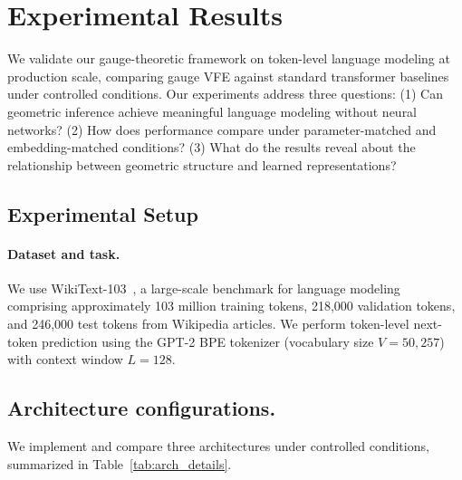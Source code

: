 \documentclass[twoside,11pt]{article}
\begin{document}
\section{Experimental Results}
\label{sec:experiments}

We validate our gauge-theoretic framework on token-level language modeling at production scale, comparing gauge VFE against standard transformer baselines under controlled conditions. Our experiments address three questions: (1) Can geometric inference achieve meaningful language modeling without neural networks? (2) How does performance compare under parameter-matched and embedding-matched conditions? (3) What do the results reveal about the relationship between geometric structure and learned representations?

\subsection{Experimental Setup}
\label{sec:setup}

\paragraph{Dataset and task.}
We use WikiText-103~\citep{merity2016pointer}, a large-scale benchmark for language modeling comprising approximately 103 million training tokens, 218,000 validation tokens, and 246,000 test tokens from Wikipedia articles. We perform token-level next-token prediction using the GPT-2 BPE tokenizer (vocabulary size $V = 50{,}257$) with context window $L=128$.

\subsection{Architecture configurations.}
We implement and compare three architectures under controlled conditions, summarized in Table~\ref{tab:arch_details}.
\end{document}
